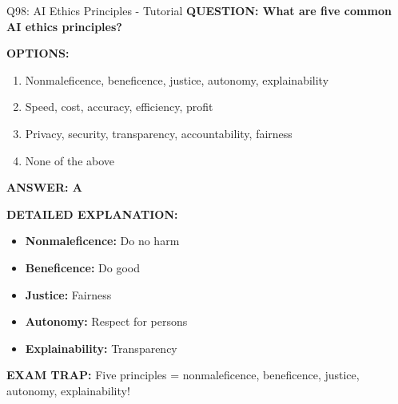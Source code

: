 \documentclass[8pt]{beamer}
\begin{document}
	\begin{frame}{Q98: AI Ethics Principles - Tutorial}
		\fontsize{6.5}{7.5}\selectfont
		\textbf{QUESTION: What are five common AI ethics principles?}
		
		\vspace{0.1cm}
		\textbf{OPTIONS:}
		\begin{enumerate}
			\item Nonmaleficence, beneficence, justice, autonomy, explainability
			\item Speed, cost, accuracy, efficiency, profit
			\item Privacy, security, transparency, accountability, fairness
			\item None of the above
		\end{enumerate}
		
		\vspace{0.1cm}
		\textcolor{myblue}{\textbf{ANSWER: A}}
		
		\vspace{0.1cm}
		\textbf{DETAILED EXPLANATION:}
		\begin{itemize}
			\item \textbf{Nonmaleficence:} Do no harm
			\item \textbf{Beneficence:} Do good
			\item \textbf{Justice:} Fairness
			\item \textbf{Autonomy:} Respect for persons
			\item \textbf{Explainability:} Transparency
		\end{itemize}
		
		\vspace{0.1cm}
		\textcolor{myred}{\textbf{EXAM TRAP:}} Five principles = \textcolor{myblue}{nonmaleficence, beneficence, justice, autonomy, explainability}!
	\end{frame}
	
\end{document}
